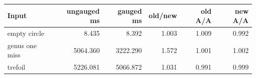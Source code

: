 \begin{center}
\small
\begin{tabular}{lrrrrr}
\toprule
Input & ungauged ms & gauged ms & old/new & old A/A & new A/A\\
\midrule
empty circle & 8.435 & 8.392 & 1.003 & 1.009 & 0.992\\
genus one miss & 5064.360 & 3222.290 & 1.572 & 1.001 & 1.002\\
trefoil & 5226.081 & 5066.872 & 1.031 & 0.991 & 0.999\\
\bottomrule
\end{tabular}
\end{center}
